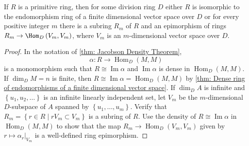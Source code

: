 \begin{corollary}
    \label{cor: Structure of primitive rings}
    If $R$ is a primitive ring, then for some division ring $D$ either $R$ is isomorphic to the endomorphism ring of a finite dimensional vector space over $D$
    or
    for every positive integer $m$ there is a subring $R_{m}$ of $R$ and an epimorphism of rings $R_{m} \rightarrow \Hom_{D}\left(V_{m}, V_{m}\right)$, where $V_{m}$ is an $m$-dimensional vector space over $D$.

    \begin{proof}
        In the notation of \ref{thm: Jacobson Density Theorem},
        \begin{equation*}
            \alpha: R \rightarrow \operatorname{Hom}_D(M, M)
        \end{equation*}
        is a monomorphism such that $R\cong\operatorname{Im} \alpha$ and $\operatorname{Im} \alpha$ is dense in $\operatorname{Hom}_D(M, M)$.
        If $\operatorname{dim}_D M=n$ is finite, then $R\cong \operatorname{Im} \alpha=\operatorname{Hom}_D(M, M)$ by \ref{thm: Dense ring of endomorphisms of a finite dimensional vector space}.
        If $\operatorname{dim}_D A$ is infinite and $\left\{u_1, u_2, \ldots\right\}$ is an infinite linearly independent set, let $V_m$ be the $m$-dimensional $D$-subspace of $A$ spanned by $\left\{u_1, \ldots, u_m\right\}$.
        Verify that $R_m=\left\{r \in R \mid r V_m \subset V_m\right\}$ is a subring of $R$.
        Use the density of $R \cong \operatorname{Im} \alpha$ in $\operatorname{Hom}_D(M, M)$ to show that the map $R_m \rightarrow \operatorname{Hom}_D\left(V_m, V_m\right)$ given by $r \mapsto \left. \alpha_r \right|_{V_m}$ is a well-defined ring epimorphism.
    \end{proof}
\end{corollary}






